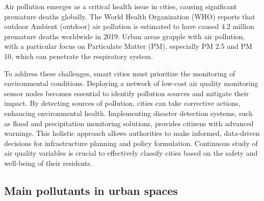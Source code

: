 Air pollution emerges as a critical health issue in cities, causing significant premature deaths globally. The World Health Organization (WHO) reports that outdoor Ambient (outdoor) air pollution is estimated to have caused 4.2 million premature deaths worldwide in 2019\cite{WHO2018AirPollution}. Urban areas grapple with air pollution, with a particular focus on Particulate Matter (PM), especially PM 2.5 and PM 10, which can penetrate the respiratory system.

To address these challenges, smart cities must prioritize the monitoring of environmental conditions. Deploying a network of low-cost air quality monitoring sensor nodes becomes essential to identify pollution sources and mitigate their impact. By detecting sources of pollution, cities can take corrective actions, enhancing environmental health. Implementing disaster detection systems, such as flood and precipitation monitoring solutions, provides citizens with advanced warnings. This holistic approach allows authorities to make informed, data-driven decisions for infrastructure planning and policy formulation. Continuous study of air quality variables is crucial to effectively classify cities based on the safety and well-being of their residents.

\subsection{Main pollutants in urban spaces}

